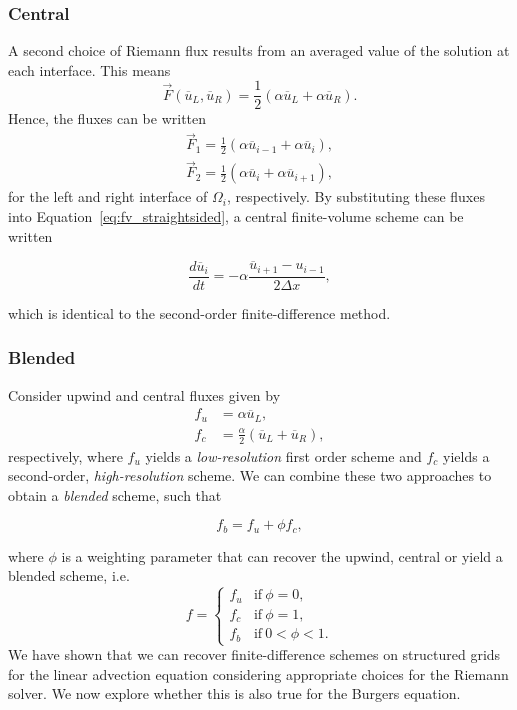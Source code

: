 \subsubsection{Central}
A second choice of Riemann flux results from an averaged value of the solution at each interface. This means
\begin{equation}
 \vec F(\overline u_L, \overline u_R) = \frac{1}{2}\left(\alpha \overline u_L + \alpha \overline u_R \right).
\end{equation}
Hence, the fluxes can be written
\begin{align}
 \vec F_1 = \frac{1}{2}\left(\alpha \overline u_{i-1} + \alpha \overline u_{i} \right),\\
 \vec F_2 = \frac{1}{2}\left(\alpha \overline u_{i} + \alpha \overline u_{i+1} \right),
\end{align}
for the left and right interface of $\Omega_i$, respectively. By substituting these fluxes into Equation~\ref{eq:fv_straightsided}, a central finite-volume scheme can be written
\begin{eqBox}
\begin{equation}
 \frac{d\overline u_i}{dt} = - \alpha \frac{\overline u_{i+1} - u_{i-1}}{2 \Delta x},
\end{equation}
\end{eqBox}
which is identical to the second-order finite-difference method. 
\subsubsection{Blended}
Consider upwind and central fluxes given by
\begin{align}
 f_u & = \alpha \overline u_L, \\
 f_c & = \frac{\alpha}{2} \left(\overline u_L + \overline u_R \right),
\end{align}
respectively, where $f_u$ yields a \textit{low-resolution} first order scheme and $f_c$ yields a second-order, \textit{high-resolution} scheme. We can combine these two approaches to obtain a \textit{blended} scheme, such that
\begin{eqBox}
\begin{equation}
 f_b = f_u + \phi f_c,
\end{equation}
\end{eqBox}
where $\phi$ is a weighting parameter that can recover the upwind, central or yield a blended scheme, i.e.
\[
 f = 
\begin{cases}
 f_u & \text{if}~\phi = 0, \\
 f_c & \text{if}~\phi = 1, \\ 
 f_b & \text{if}~0 < \phi < 1. 
\end{cases}
\]
We have shown that we can recover finite-difference schemes on structured grids for the linear advection equation considering appropriate choices for the Riemann solver. We now explore whether this is also true for the Burgers equation.
